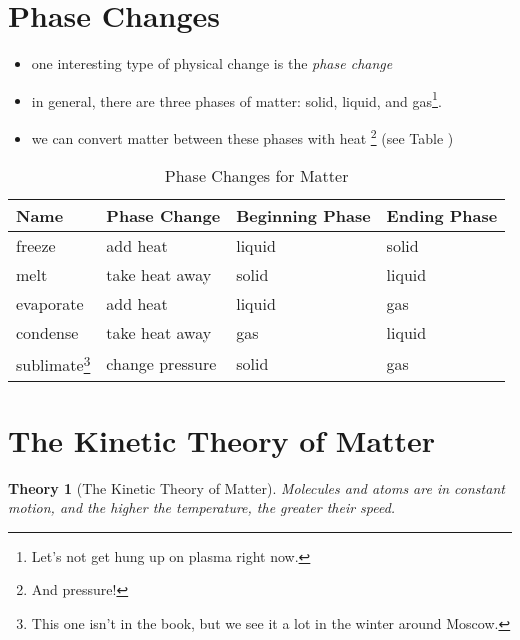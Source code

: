 \documentclass[11pt, oneside]{article}   	%
\newtheorem{theory}{Theory}
\begin{document}
\section{Phase Changes}
\begin{itemize}
\item one interesting type of physical change is the \emph{phase change}
\item in general, there are three phases of matter: solid, liquid, and gas\footnote{Let's not get hung up on plasma right now.}.
\item we can convert matter between these phases with heat \footnote{And pressure!} (see Table \label{table:phase-changes})
\end{itemize}

\begin{table}
\centering
\begin{tabular}[b]{| l | l | l | l |}
\textbf{Name} & \textbf{Phase Change} & \textbf{Beginning Phase} & \textbf{Ending Phase} \\
\hline
freeze & add heat & liquid & solid \\
melt & take heat away & solid & liquid \\
evaporate & add heat & liquid & gas \\
condense & take heat away & gas & liquid \\
sublimate\footnote{This one isn't in the book, but we see it a lot in the winter around Moscow.} & change pressure & solid & gas \\
\end{tabular}
\caption{Phase Changes for Matter}
\label{table:phase-changes}
\end{table}

\section{The Kinetic Theory of Matter}
\begin{theory}[The Kinetic Theory of Matter]\label{theory:kinetic-theory-matter}
Molecules and atoms are in constant motion, and the higher the temperature, the greater their speed.
\end{theory}
\end{document}
